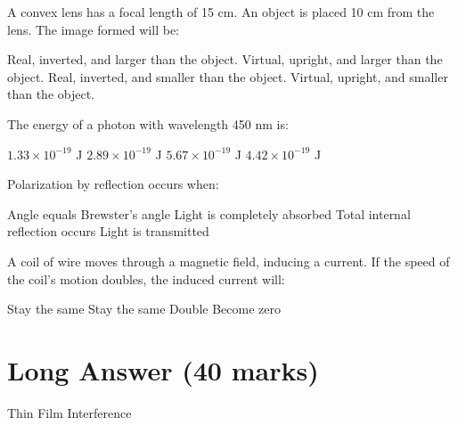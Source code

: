 \documentclass[addpoints]{exam}
\begin{document}
\begin{questions}
\question[1] A convex lens has a focal length of 15 cm. An object is placed 10 cm from the lens. The image formed will be:
\begin{choices}
    \choice Real, inverted, and larger than the object.
    \correctchoice Virtual, upright, and larger than the object.
    \choice Real, inverted, and smaller than the object.
    \choice Virtual, upright, and smaller than the object.
\end{choices}

\question[1] The energy of a photon with wavelength 450 nm is:
\begin{choices}
    \choice \(1.33 \times 10^{-19}\) J
    \choice \(2.89 \times 10^{-19}\) J
    \choice \(5.67 \times 10^{-19}\) J
    \correctchoice \(4.42 \times 10^{-19}\) J
\end{choices}

\question[1] Polarization by reflection occurs when:
\begin{choices}
    \correctchoice Angle equals Brewster's angle
    \choice Light is completely absorbed
    \choice Total internal reflection occurs
    \choice Light is transmitted
\end{choices}

\question[1] A coil of wire moves through a magnetic field, inducing a current. If the speed of the coil’s motion doubles, the induced current will:
\begin{choices}
    \choice Stay the same
    \choice Stay the same
    \correctchoice Double
    \choice Become zero
\end{choices}

\section*{Long Answer (40 marks)}

\question Thin Film Interference
\begin{solution} [8cm]


\end{solution}
\end{questions}
\end{document}
